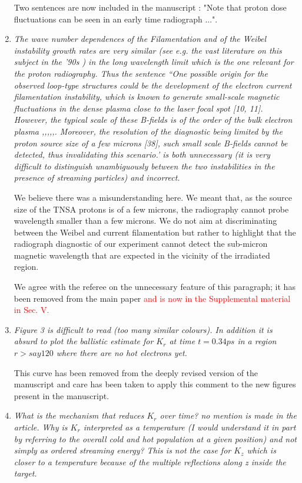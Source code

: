 \documentclass[aps,showpacs,superscriptaddress]{revtex4}%
\begin{document}
\begin{enumerate}
Two sentences are now included in the manuscript : "Note that proton dose fluctuations can be seen in an early time radiograph ...".

\item \textit{The wave number dependences of the Filamentation and of the Weibel instability growth rates are very similar (see e.g. the vast literature on this subject in the '90s ) in the long wavelength limit which is the one relevant for the proton radiography. Thus the sentence ``One possible origin for the observed loop-type structures could be the development of the electron current filamentation instability, which is known to generate small-scale magnetic fluctuations in the dense plasma close to the laser focal spot [10, 11]. However, the typical scale of these B-fields is of the order of the bulk electron plasma ,,,,,. Moreover, the resolution of the diagnostic being limited by the proton source size of a few microns [38], such small scale B-fields cannot be detected, thus invalidating this scenario.' is both unnecessary (it is very difficult to distinguish unambiguously between the two instabilities in the presence of streaming particles) and incorrect.} 

We believe there was a misunderstanding here. We meant that, 
as the source size of the TNSA protons is of a few microns, the radiography cannot probe wavelength smaller than a few microns.  
We do not aim at discriminating between the Weibel and current filamentation but rather to highlight that the radiograph diagnostic of our experiment cannot detect the sub-micron magnetic wavelength that are expected in the vicinity of the irradiated region.

We  agree with the referee on the unnecessary feature of this paragraph;  it has been  removed from the main paper \textcolor{red}{and is now in the Supplemental material in Sec. V.}

\item \textit{Figure 3 is difficult to read (too many similar colours). In addition it is absurd to plot the ballistic estimate for $K_r$ at time $ t = 0.34 ps$ in a region $r > say 120$ where there are no hot electrons yet. }

This curve has been removed from the deeply revised version of the manuscript and care has been taken to apply this comment to the new figures present in the manuscript.

\item \textit{What is the mechanism that reduces $K_r$ over time? no mention is made in the article. Why is $K_r$ interpreted as a temperature (I would understand it in part by referring to the overall cold and hot population at a given position) and not simply as ordered streaming energy? This is not the case for $K_z$ which is closer to a temperature because of the multiple reflections along z inside the target.}


\end{enumerate}
\end{document}
